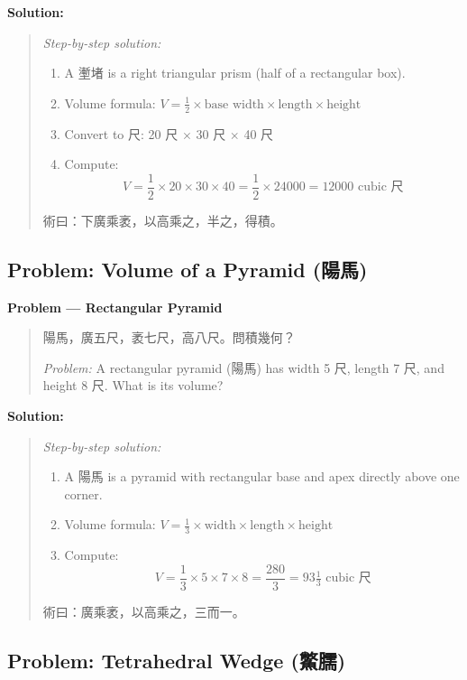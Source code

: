 \documentclass[11pt,a4paper]{article}
\newcommand{\zh}[1]{{#1}}
\newenvironment{chproblem}[1][]{%
  \par\medskip\noindent\textbf{\textcolor{sectioncolor}{#1}}\par\nopagebreak
  \begin{quote}\small
}{%
  \end{quote}\medskip
}
\newenvironment{chsolution}{%
  \par\medskip\noindent\textbf{\textcolor{notecolor}{Solution:}}\par\nopagebreak
  \begin{quote}\small
}{%
  \end{quote}\medskip
}
\newenvironment{stepbystep}{%
  \par\smallskip\noindent\textit{Step-by-step solution:}\par\nopagebreak
  \begin{enumerate}[leftmargin=2em,label=\textbf{Step \arabic*:},ref=\arabic*]
}{%
  \end{enumerate}\medskip
}
\begin{document}
\begin{chsolution}
\begin{stepbystep}
\item A \zh{壍堵} is a right triangular prism (half of a rectangular box).

\item Volume formula: $V = \frac{1}{2} \times \text{base width} \times \text{length} \times \text{height}$

\item Convert to \zh{尺}: 20 \zh{尺} $\times$ 30 \zh{尺} $\times$ 40 \zh{尺}

\item Compute:
\[
V = \frac{1}{2} \times 20 \times 30 \times 40 = \frac{1}{2} \times 24000 = 12000 \text{ cubic \zh{尺}}
\]
\end{stepbystep}

\zh{術曰：下廣乘袤，以高乘之，半之，得積。}
\end{chsolution}

\subsection{Problem: Volume of a Pyramid (陽馬)}

\begin{chproblem}[Problem --- Rectangular Pyramid]
\zh{陽馬，廣五尺，袤七尺，高八尺。問積幾何？}

\medskip
\textit{Problem:} A rectangular pyramid (\zh{陽馬}) has width 5 \zh{尺},
length 7 \zh{尺}, and height 8 \zh{尺}. What is its volume?
\end{chproblem}

\begin{chsolution}
\begin{stepbystep}
\item A \zh{陽馬} is a pyramid with rectangular base and apex directly above
one corner.

\item Volume formula: $V = \frac{1}{3} \times \text{width} \times \text{length} \times \text{height}$

\item Compute:
\[
V = \frac{1}{3} \times 5 \times 7 \times 8 = \frac{280}{3} = 93\tfrac{1}{3} \text{ cubic \zh{尺}}
\]
\end{stepbystep}

\zh{術曰：廣乘袤，以高乘之，三而一。}
\end{chsolution}

\subsection{Problem: Tetrahedral Wedge (鱉臑)}
\end{document}
